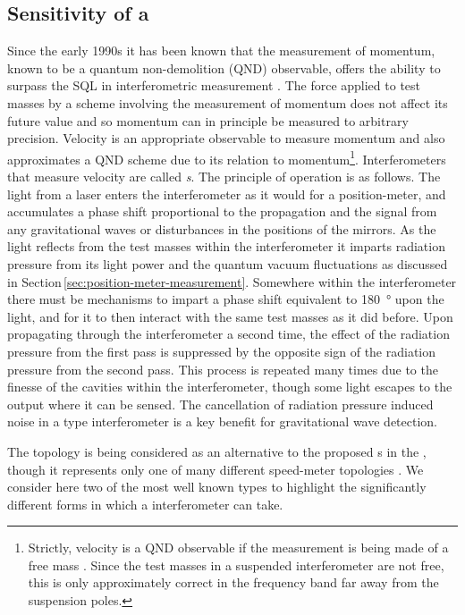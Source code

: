 \subsection{\label{sec:speed-meter-measurement}Sensitivity of a \SM{}}
Since the early 1990s it has been known that the measurement of momentum, known to be a quantum non-demolition (\gls{QND}) observable, offers the ability to surpass the \gls{SQL} in interferometric measurement \cite{Braginsky1990}. The force applied to test masses by a scheme involving the measurement of momentum does not affect its future value and so momentum can in principle be measured to arbitrary precision. Velocity is an appropriate observable to measure momentum and also approximates a \gls{QND} scheme due to its relation to momentum\footnote{Strictly, velocity is a \gls{QND} observable if the measurement is being made of a free mass \cite{Danilishin2012}. Since the test masses in a suspended interferometer are not free, this is only approximately correct in the frequency band far away from the suspension poles.}. Interferometers that measure velocity are called \emph{\SM{}s}. The principle of operation is as follows. The light from a laser enters the interferometer as it would for a position-meter, and accumulates a phase shift proportional to the propagation and the signal from any gravitational waves or disturbances in the positions of the mirrors. As the light reflects from the test masses within the interferometer it imparts radiation pressure from its light power and the quantum vacuum fluctuations as discussed in Section\,\ref{sec:position-meter-measurement}. Somewhere within the interferometer there must be mechanisms to impart a phase shift equivalent to \SI{180}{\degree} upon the light, and for it to then interact with the same test masses as it did before. Upon propagating through the interferometer a second time, the effect of the radiation pressure from the first pass is suppressed by the opposite sign of the radiation pressure from the second pass. This process is repeated many times due to the finesse of the cavities within the interferometer, though some light escapes to the output where it can be sensed. The cancellation of radiation pressure induced noise in a \SM{} type interferometer is a key benefit for gravitational wave detection.

The \SSM{} topology is being considered as an alternative to the proposed \MI{}s in the \ET{} \cite{MuellerEbhardt2009a, Voronchev2015}, though it represents only one of many different speed-meter topologies \cite{Danilishin2004, Wang2013, Huttner2016, Wade2012}. We consider here two of the most well known types to highlight the significantly different forms in which a \SM{} interferometer can take.

